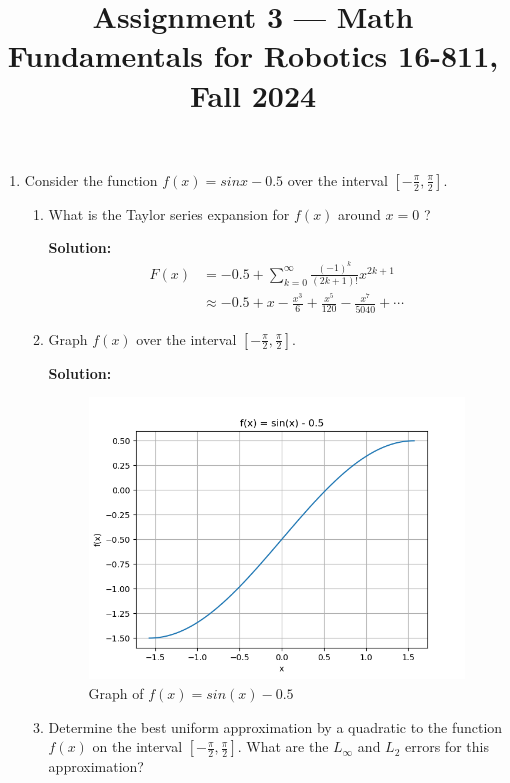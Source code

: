 \documentclass[conference,onecolumn]{IEEEtran}
\begin{document}
\title{\Large Assignment 3 --- Math Fundamentals for Robotics 16-811, Fall 2024}

\author{
}

\maketitle

\begin{enumerate}[label=\arabic{enumi}.]
      \item Consider the function $f (x) = sin x - 0.5$ over the interval $[-\frac{\pi}{2}, \frac{\pi}{2}]$.
            \begin{enumerate}
                  \item What is the Taylor series expansion for $f (x)$ around $x = 0$ ?

                        \textbf{Solution:}
                        \begin{align*}
                              F(x) & = -0.5 + \sum_{k = 0}^\infty \frac{(-1)^k}{(2k + 1)!} x^{2k + 1}               \\
                                   & \approx -0.5 + x - \frac{x^3}{6} + \frac{x^5}{120} - \frac{x^7}{5040} + \cdots
                        \end{align*}
                  \item Graph $f (x)$ over the interval $[-\frac{\pi}{2}, \frac{\pi}{2}]$.

                        \textbf{Solution:}
                        \begin{figure}[H]
                              \centering
                              \includegraphics[width=0.5\linewidth]{figs/Q1.png}
                              \caption{Graph of $f(x) = sin (x) - 0.5$}
                        \end{figure}
                  \item Determine the best uniform approximation by a quadratic to the function $f (x)$ on the interval $[-\frac{\pi}{2}, \frac{\pi}{2}]$.
                        What are the $L_{\infty}$ and $L_2$ errors for this approximation?


\end{enumerate}
\end{enumerate}
\end{document}
